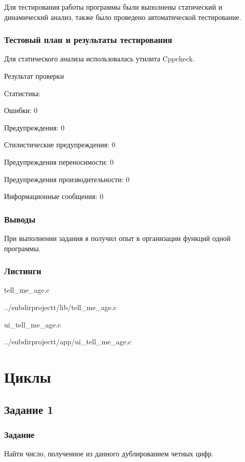 \documentclass[12pt,a4paper]{report}
\begin{document}
Для тестирования работы программы были выполнены статический и динамический анализ, также было проведено автоматической тестирование.

\subsection{Тестовый план и результаты тестирования}

		Для статического анализа использовалась утилита Cppcheck.
		
		\vspace{\baselineskip}
		Результат проверки 
		
		Статистика:
		
		Ошибки:	0
		
		Предупреждения:	0
		
		Стилистические предупреждения:	0
		
		Предупреждения переносимости:	0
		
		Предупреждения производительности:	0
		
		Информационные сообщения:	0
		
\subsection{Выводы}

При выполнении задания я получил опыт в организации функций одной программы.

\subsection*{Листинги}
tell_me_age.c

{../subdirprojectt/lib/tell_me_age.c}

\vspace{\baselineskip}

ui_tell_me_age.c

{../subdirprojectt/app/ui_tell_me_age.c}


\chapter{Циклы}
\section{Задание 1}
\subsection{Задание}

Найти число, полученное из данного дублированием четных цифр.
\end{document}
